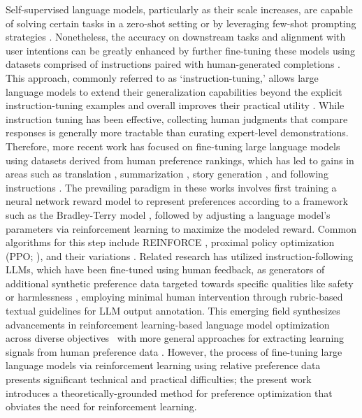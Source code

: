 Self-supervised language models, particularly as their scale increases, are capable of solving certain tasks in a zero-shot setting \citep{radford2019language} or by leveraging few-shot prompting strategies \citep{gpt3,megatron,chowdhery2022palm}. Nonetheless, the accuracy on downstream tasks and alignment with user intentions can be greatly enhanced by further fine-tuning these models using datasets comprised of instructions paired with human-generated completions \citep{mishra-etal-2022-cross,sanh2022multitask,chung2022scaling,thoppilan2022lamda}. This approach, commonly referred to as ‘instruction-tuning,’ allows large language models to extend their generalization capabilities beyond the explicit instruction-tuning examples and overall improves their practical utility \citep{chung2022scaling}. While instruction tuning has been effective, collecting human judgments that compare responses is generally more tractable than curating expert-level demonstrations. Therefore, more recent work has focused on fine-tuning large language models using datasets derived from human preference rankings, which has led to gains in areas such as translation \citep{kreutzer-etal-2018-reliability}, summarization \citep{stiennon2022learning,ziegler2020finetuning}, story generation \citep{ziegler2020finetuning}, and following instructions \citep{ouyang2022training,ramamurthy2023is}. The prevailing paradigm in these works involves first training a neural network reward model to represent preferences according to a framework such as the Bradley-Terry model \citep{bradley1952rankanalysis}, followed by adjusting a language model’s parameters via reinforcement learning to maximize the modeled reward. Common algorithms for this step include REINFORCE \citep{williams1992reinforce}, proximal policy optimization (PPO; \cite{schulman2017proximal}), and their variations \citep{ramamurthy2023is}. Related research has utilized instruction-following LLMs, which have been fine-tuned using human feedback, as generators of additional synthetic preference data targeted towards specific qualities like safety or harmlessness \citep{bai2022constitutional}, employing minimal human intervention through rubric-based textual guidelines for LLM output annotation. This emerging field synthesizes advancements in reinforcement learning-based language model optimization across diverse objectives~\citep{Ranzato2015SequenceLT,paulus2018a,wu2018learning} with more general approaches for extracting learning signals from human preference data \citep{christiano2017deep,kupcsik2018learning}. However, the process of fine-tuning large language models via reinforcement learning using relative preference data presents significant technical and practical difficulties; the present work introduces a theoretically-grounded method for preference optimization that obviates the need for reinforcement learning.

